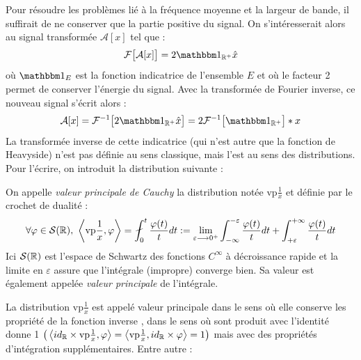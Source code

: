 Pour résoudre les problèmes lié à la fréquence moyenne et la largeur de bande, il suffirait de ne conserver que la partie positive du signal. On s'intéresserait alors au signal transformée $\mathcal{A}[x]$ tel que :
\[\mathcal{F}\big[\mathcal{A}[x]\big] = 2\one_{\R^+}\hat{x}\]
où $\one_E$ est la fonction indicatrice de l'ensemble $E$ et où le facteur 2 permet de conserver l'énergie du signal.
Avec la transformée de Fourier inverse, ce nouveau signal s'écrit alors :
\[\mathcal{A}[x] = \mathcal{F}^{-1}\big[ 2\one_{\R^+}\hat{x} \big] = 2 \mathcal{F}^{-1}\big[\one_{\R^+}\big] * x\]
La transformée inverse de cette indicatrice (qui n'est autre que la fonction de Heavyside) n'est pas définie au sens classique, mais l'est au sens des distributions. Pour l'écrire, on introduit la distribution suivante :
\\

\begin{definition}\label{def:vp&Hilb}
	On appelle \emph{valeur principale de Cauchy} la distribution notée vp$\frac{1}{x}$ et définie par le crochet de dualité :
	\begin{equation}
		\forall \varphi\in\mathcal{S}(\R),\ \left\langle \text{vp}\frac{1}{x}, \varphi \right\rangle = \fint_0^t \frac{\varphi(t)}{t}dt := \lim_{\varepsilon\lr0^+} \int_{-\infty}^{-\varepsilon} \frac{\varphi(t)}{t}dt + \int_{+\varepsilon}^{+\infty} \frac{\varphi(t)}{t}dt
	\end{equation}
	Ici $\mathcal{S}(\mathbb{R})$ est l’espace de Schwartz des fonctions $C^\infty$ à décroissance rapide et la limite en $\varepsilon$ assure que l'intégrale (impropre) converge bien. Sa valeur est également appelée \emph{valeur principale} de l'intégrale. 
\end{definition}

La distribution vp$\frac{1}{x}$ est appelé valeur principale dans le sens où elle conserve les propriété de la fonction inverse , dans le sens où sont produit avec l'identité donne 1 $\big(\left\langle id_{\mathbb{R}} \times \text{vp}\frac{1}{x}, \varphi \right\rangle = \left\langle \text{vp}\frac{1}{x}, id_{\mathbb{R}} \times\varphi \right\rangle=1\big)$ mais avec des propriétés d'intégration supplémentaires. Entre autre :
\\

